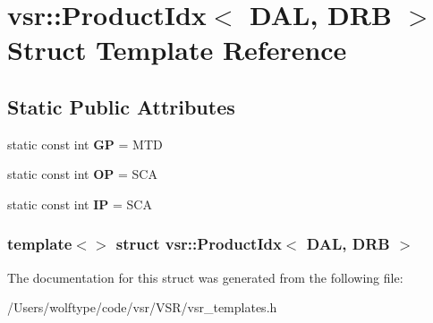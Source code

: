 \hypertarget{structvsr_1_1_product_idx_3_01_d_a_l_00_01_d_r_b_01_4}{\section{vsr\-:\-:Product\-Idx$<$ D\-A\-L, D\-R\-B $>$ Struct Template Reference}
\label{structvsr_1_1_product_idx_3_01_d_a_l_00_01_d_r_b_01_4}
}
\subsection*{Static Public Attributes}
\begin{DoxyCompactItemize}
\item 
\hypertarget{structvsr_1_1_product_idx_3_01_d_a_l_00_01_d_r_b_01_4_ae7064ea8ce48d33dd9bfc14498d572e9}{static const int {\bfseries G\-P} = M\-T\-D}\label{structvsr_1_1_product_idx_3_01_d_a_l_00_01_d_r_b_01_4_ae7064ea8ce48d33dd9bfc14498d572e9}

\item 
\hypertarget{structvsr_1_1_product_idx_3_01_d_a_l_00_01_d_r_b_01_4_a16756972ca2263e48789c9b63ba91e08}{static const int {\bfseries O\-P} = S\-C\-A}\label{structvsr_1_1_product_idx_3_01_d_a_l_00_01_d_r_b_01_4_a16756972ca2263e48789c9b63ba91e08}

\item 
\hypertarget{structvsr_1_1_product_idx_3_01_d_a_l_00_01_d_r_b_01_4_a66a874b3d475d646c5defcf1835846b7}{static const int {\bfseries I\-P} = S\-C\-A}\label{structvsr_1_1_product_idx_3_01_d_a_l_00_01_d_r_b_01_4_a66a874b3d475d646c5defcf1835846b7}

\end{DoxyCompactItemize}
\subsubsection*{template$<$$>$ struct vsr\-::\-Product\-Idx$<$ D\-A\-L, D\-R\-B $>$}



The documentation for this struct was generated from the following file\-:\begin{DoxyCompactItemize}
\item 
/\-Users/wolftype/code/vsr/\-V\-S\-R/vsr\-\_\-templates.\-h\end{DoxyCompactItemize}
